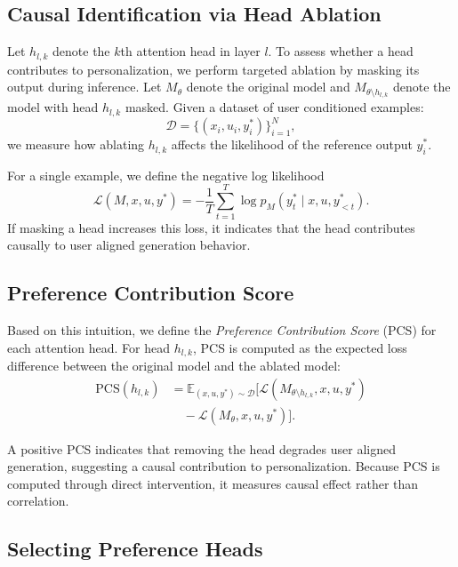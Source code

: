 \documentclass[11pt]{article}
\begin{document}
\subsection{Causal Identification via Head Ablation}

Let $h_{l,k}$ denote the $k$th attention head in layer $l$.
To assess whether a head contributes to personalization, we perform targeted ablation by masking its output during inference.
Let $M_\theta$ denote the original model and $M_{\theta \setminus h_{l,k}}$ denote the model with head $h_{l,k}$ masked. Given a dataset of user conditioned examples:
\begin{equation}
\mathcal{D} = \{(x_i, u_i, y_i^\ast)\}_{i=1}^N,
\end{equation}
we measure how ablating $h_{l,k}$ affects the likelihood of the reference output $y_i^\ast$.

For a single example, we define the negative log likelihood
\begin{equation}
\mathcal{L}(M, x, u, y^\ast)
= - \frac{1}{T} \sum_{t=1}^{T}
\log p_M(y_t^\ast \mid x, u, y_{<t}^\ast).
\end{equation}
If masking a head increases this loss, it indicates that the head contributes causally to user aligned generation behavior.

\subsection{Preference Contribution Score}

Based on this intuition, we define the \emph{Preference Contribution Score} (PCS) for each attention head.
For head $h_{l,k}$, PCS is computed as the expected loss difference between the original model and the ablated model:
\begin{align}
\mathrm{PCS}(h_{l,k})
&=
\mathbb{E}_{(x,u,y^\ast)\sim \mathcal{D}}
\big[
\mathcal{L}(M_{\theta \setminus h_{l,k}}, x, u, y^\ast)
\nonumber \\
&\quad -
\mathcal{L}(M_\theta, x, u, y^\ast)
\big].
\end{align}

A positive PCS indicates that removing the head degrades user aligned generation, suggesting a causal contribution to personalization.
Because PCS is computed through direct intervention, it measures causal effect rather than correlation.

\subsection{Selecting Preference Heads}
\end{document}
